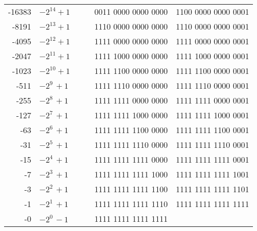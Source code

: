 \documentclass[a4paper,10pt]{article}
\begin{document}
\begin{center}
\begin{tabular}{rlrrrr}
   -16383 &$ -2^{14} + 1 $&                     &      & 0011 0000 0000 0000 & 1100 0000 0000 0001 \\
    -8191 &$ -2^{13} + 1 $&                     &      & 1110 0000 0000 0000 & 1110 0000 0000 0001 \\
    -4095 &$ -2^{12} + 1 $&                     &      & 1111 0000 0000 0000 & 1111 0000 0000 0001 \\
    -2047 &$ -2^{11} + 1 $&                     &      & 1111 1000 0000 0000 & 1111 1000 0000 0001 \\
    -1023 &$ -2^{10} + 1 $&                     &      & 1111 1100 0000 0000 & 1111 1100 0000 0001 \\
     -511 &$ -2^{9~} + 1 $&                     &      & 1111 1110 0000 0000 & 1111 1110 0000 0001 \\
     -255 &$ -2^{8~} + 1 $&                     &      & 1111 1111 0000 0000 & 1111 1111 0000 0001 \\
     -127 &$ -2^{7~} + 1 $&                     &      & 1111 1111 1000 0000 & 1111 1111 1000 0001 \\
      -63 &$ -2^{6~} + 1 $&                     &      & 1111 1111 1100 0000 & 1111 1111 1100 0001 \\
      -31 &$ -2^{5~} + 1 $&                     &      & 1111 1111 1110 0000 & 1111 1111 1110 0001 \\
      -15 &$ -2^{4~} + 1 $&                     &      & 1111 1111 1111 0000 & 1111 1111 1111 0001 \\
       -7 &$ -2^{3~} + 1 $&                     &      & 1111 1111 1111 1000 & 1111 1111 1111 1001 \\
       -3 &$ -2^{2~} + 1 $&                     &      & 1111 1111 1111 1100 & 1111 1111 1111 1101 \\
       -1 &$ -2^{1~} + 1 $&                     &      & 1111 1111 1111 1110 & 1111 1111 1111 1111 \\
       -0 &$ -2^{0~} - 1 $&                     &      & 1111 1111 1111 1111 &                     \\
    \bottomrule
\end{tabular}
\end{center}
\end{document}
